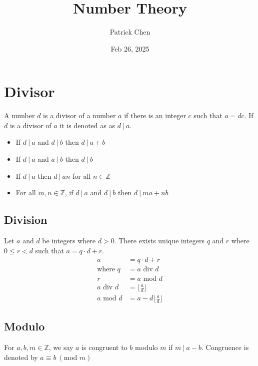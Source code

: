 \documentclass{article}
\title{Number Theory}
\author{Patrick Chen}
\date{Feb 26, 2025}
\theoremstyle{mytheoremstyle}
\theoremstyle{mytheoremstyle}
\theoremstyle{myproblemstyle}
\newcommand{\modm}[1]{\ (\text{mod }#1)}
\begin{document}
    \maketitle
    \section*{Divisor}
    A number $d$ is a divisor of a number $a$ if there is an integer
    $c$ such that $a=dc$. If $d$ is a divisor of $a$ it is denoted as as $d\ |\ a$.
    \begin{itemize}
        \item If $d\ |\ a$ and $d\ |\ b$ then $d\ |\ a+b$
        \item If $d\ |\ a$ and $a\ |\ b$ then $d\ |\ b$
        \item If $d\ |\ a$ then $d\ |\ an$ for all $n\in\mathbb{Z}$
        \item For all $m,n\in \mathbb{Z}$, if $d\ |\ a$ and $d\ |\ b$ then $d\ |\ ma+nb$
    \end{itemize}

    \subsection*{Division}
    Let $a$ and $d$ be integers where $d>0$. There exists unique integers $q$ and $r$ where
    $0\le r <d$ such that $a = q\cdot d + r$.
    \begin{align*}
        a &= q\cdot d + r \\
        \text{where } q &= a \text{ div } d \\
                      r &= a \text{ mod } d \\
        a\text{ div } d &= \Big\lfloor\frac{a}{d}\Big\rfloor\\
        a\text{ mod } d &= a-d\Big\lfloor\frac{a}{d}\Big\rfloor
    \end{align*}

    \subsection*{Modulo}
    For $a,b,m\in \mathbb{Z}$, we say $a$ is congruent to $b$ modulo $m$ if
    $m\ |\ a-b$.
    Congruence is denoted by $a\equiv b \modm{m}$
\end{document}
